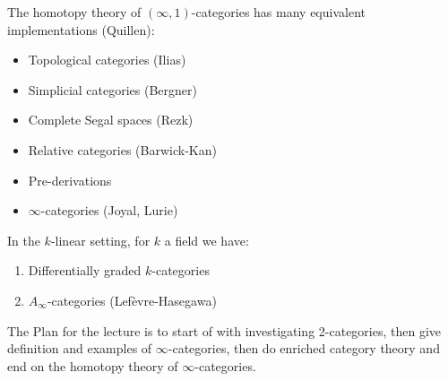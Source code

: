 \begin{Warning}
    The homotopy theory of $ ( \infty ,1 ) $-categories has many equivalent implementations (Quillen):
    \begin{itemize}
        \item 
        Topological categories (Ilias)

        \item 
        Simplicial categories (Bergner)

        \item 
        Complete Segal spaces (Rezk)

        \item 
        Relative categories (Barwick-Kan)

        \item 
        Pre-derivations

        \item 
        $\infty$-categories (Joyal, Lurie)
    \end{itemize}

    In the $k$-linear setting, for $k$ a field we have:

    \begin{enumerate}[resume]
        \item 
        Differentially graded $k$-categories

        \item 
        $A_\infty$-categories (Lefèvre-Hasegawa)
    \end{enumerate}
    
\end{Warning}

The Plan for the lecture is to start of with investigating 2-categories, then give definition and examples of $ \infty $-categories, then do enriched category theory and end on the homotopy theory of $\infty$-categories.
